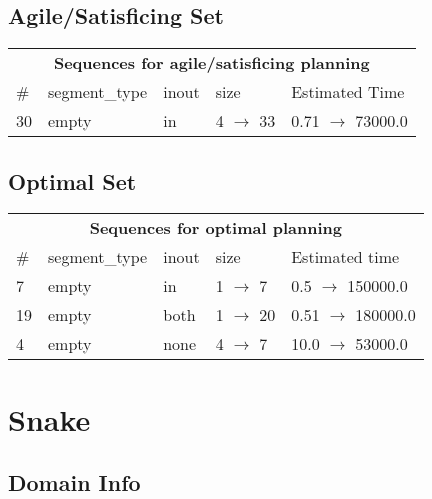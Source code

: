 \documentclass{article}
\begin{document}
                         \subsection*{Agile/Satisficing Set}

                        \begin{center}
                        \begin{tabular}{l|l|l|l|l}
                        \multicolumn{5}{c}{\bf \large Sequences for agile/satisficing planning}\\
                        \# & segment\_type & inout & size & Estimated Time\\\midrule
                        30&empty&in&4 $\rightarrow$ 33&0.71 $\rightarrow$ 73000.0
                        \end{tabular}
                        \end{center}
                    
                            \subsection*{Optimal Set}

                            \begin{center}
                            \begin{tabular}{l|l|l|l|l}
                            \multicolumn{5}{c}{\bf \large Sequences for optimal planning}\\
                            \# & segment\_type & inout & size & Estimated time\\\midrule
                            7&empty&in&1 $\rightarrow$ 7&0.5 $\rightarrow$ 150000.0\\
19&empty&both&1 $\rightarrow$ 20&0.51 $\rightarrow$ 180000.0\\
4&empty&none&4 $\rightarrow$ 7&10.0 $\rightarrow$ 53000.0
                            \end{tabular}
                            \end{center}
                    \newpage \section{Snake}
                    \subsection*{Domain Info}
\end{document}
